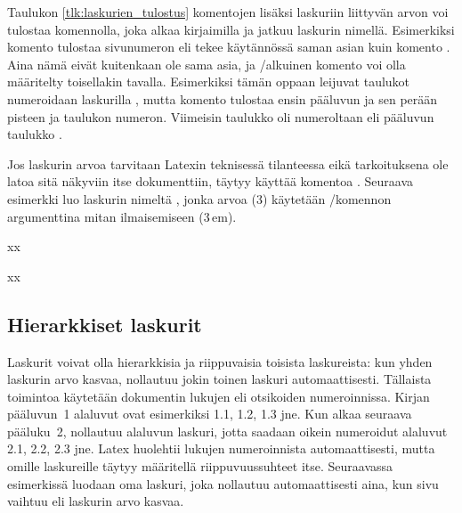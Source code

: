 Taulukon \ref{tlk:laskurien_tulostus} komentojen lisäksi laskuriin
liittyvän arvon voi tulostaa komennolla, joka alkaa kirjaimilla
 ja jatkuu laskurin nimellä. Esimerkiksi komento
 tulostaa sivunumeron eli tekee käytännössä saman
asian kuin komento . Aina nämä eivät
kuitenkaan ole sama asia, ja \-/alkuinen komento voi
olla määritelty toisellakin tavalla. Esimerkiksi tämän oppaan leijuvat
taulukot numeroidaan laskurilla , mutta komento
 tulostaa ensin pääluvun ja sen perään pisteen
ja taulukon numeron. Viimeisin taulukko oli numeroltaan \thetable{} eli
pääluvun  taulukko .

Jos laskurin arvoa tarvitaan Latexin teknisessä tilanteessa eikä
tarkoituksena ole latoa sitä näkyviin itse dokumenttiin, täytyy käyttää
komentoa . Seuraava esimerkki luo laskurin nimeltä
, jonka arvoa (3) käytetään \-/komennon
argumenttina mitan ilmaisemiseen (3\,em).


\begin{koodilohkosis}
  \setcounter{mitta}{3}
  xx
\end{koodilohkosis}

\begin{tulossis}
  x\hspace{3em}x
\end{tulossis}

\subsection{Hierarkkiset laskurit}

Laskurit voivat olla hierarkkisia ja riippuvaisia toisista laskureista:
kun yhden laskurin arvo kasvaa, nollautuu jokin toinen laskuri
automaattisesti. Tällaista toimintoa käytetään dokumentin lukujen eli
otsikoiden numeroinnissa. Kirjan pääluvun~1 alaluvut ovat esimerkiksi
1.1, 1.2, 1.3 jne. Kun alkaa seuraava pääluku~2, nollautuu alaluvun
laskuri, jotta saadaan oikein numeroidut alaluvut 2.1, 2.2, 2.3 jne.
Latex huolehtii lukujen numeroinnista automaattisesti, mutta omille
laskureille täytyy määritellä riippuvuussuhteet itse. Seuraavassa
esimerkissä luodaan oma laskuri, joka nollautuu automaattisesti aina,
kun sivu vaihtuu eli laskurin  arvo kasvaa.

